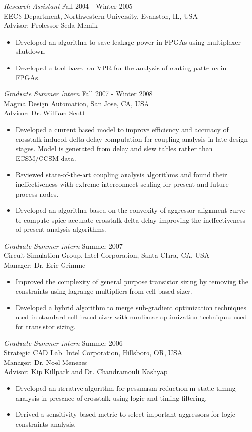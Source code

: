 \documentclass[margin]{res}
\begin{document}
\begin{resume}
{\sl Research Assistant} \hfill Fall 2004 - Winter 2005\\
EECS Department, Northwestern University, Evanston, IL, USA\\
Advisor: Professor Seda Memik
\begin{itemize} \itemsep -2pt
\item Developed an algorithm to save leakage power in FPGAs using multiplexer shutdown.
\item Developed a tool based on VPR for the analysis of routing patterns in FPGAs.
\end{itemize}

{\sl Graduate Summer Intern} \hfill Fall 2007 - Winter 2008\\
Magma Design Automation, San Jose, CA, USA\\ 
Advisor: Dr. William Scott
\begin{itemize} \itemsep -2pt
\item Developed a current based model to improve efficiency and accuracy of crosstalk 
  induced delta delay computation for coupling analysis in late design stages. Model is generated
  from delay and slew tables rather than ECSM/CCSM data.
\item Reviewed state-of-the-art coupling analysis algorithms and found their ineffectiveness with
  extreme interconnect scaling for present and future process nodes.
\item Developed an algorithm based on the convexity of aggressor alignment curve to compute
  spice accurate crosstalk delta delay improving the ineffectiveness of present analysis algorithms.
\end{itemize}
    
{\sl Graduate Summer Intern} \hfill Summer 2007\\
Circuit Simulation Group, Intel Corporation, Santa Clara, CA, USA\\
Manager: Dr. Eric Grimme
\begin{itemize} \itemsep -2pt
\item Improved the complexity of general purpose transistor sizing by removing the constraints using
  lagrange multipliers from cell based sizer.
\item Developed a hybrid algorithm to merge sub-gradient optimization techniques used in standard cell
  based sizer with nonlinear optimization techniques used for transistor sizing.
\end{itemize}

{\sl Graduate Summer Intern} \hfill Summer 2006\\
Strategic CAD Lab, Intel Corporation, Hillsboro, OR, USA\\
Manager: Dr. Noel Menezes\\
Advisor: Kip Killpack and Dr. Chandramouli Kashyap
\begin{itemize} \itemsep -2pt
\item Developed an iterative algorithm for pessimism reduction in static timing analysis in presence 
  of crosstalk using logic and timing filtering. 
\item Derived a sensitivity based metric to select important aggressors for logic constraints analysis.
\end{itemize}


\end{resume}
\end{document}
